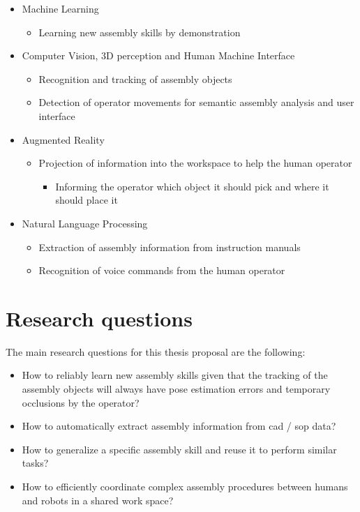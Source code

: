 \begin{itemize}
	\item Machine Learning
	\begin{itemize}
		\item Learning new assembly skills by demonstration
	\end{itemize}
	\item Computer Vision, 3D perception and Human Machine Interface
	\begin{itemize}
		\item Recognition and tracking of assembly objects
		\item Detection of operator movements for semantic assembly analysis and user interface
	\end{itemize}
	\item Augmented Reality
	\begin{itemize}
		\item Projection of information into the workspace to help the human operator
		\begin{itemize}
			\item Informing the operator which object it should pick and where it should place it
		\end{itemize}
	\end{itemize}
	\item Natural Language Processing
	\begin{itemize}
		\item Extraction of assembly information from instruction manuals
		\item Recognition of voice commands from the human operator
	\end{itemize}
\end{itemize}



\section{Research questions}

The main research questions for this thesis proposal are the following:

\begin{itemize}
	\item How to reliably learn new assembly skills given that the tracking of the assembly objects will always have pose estimation errors and temporary occlusions by the operator?
	\item How to automatically extract assembly information from \gls{cad} / \gls{sop} data?
	\item How to generalize a specific assembly skill and reuse it to perform similar tasks?
	\item How to efficiently coordinate complex assembly procedures between humans and robots in a shared work space?
\end{itemize}



